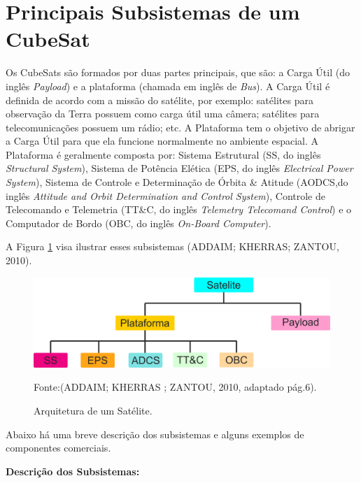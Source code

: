 \section{Principais Subsistemas de um CubeSat}

Os CubeSats são formados por duas partes principais, que são: a Carga Útil (do inglês \textit{Payload}) e a plataforma (chamada em inglês de \textit{Bus}). A Carga Útil é definida de acordo com a missão do satélite, por exemplo: satélites para observação da Terra possuem como carga útil uma câmera; satélites para telecomunicações possuem um rádio; etc. A Plataforma tem o objetivo de abrigar a Carga Útil para que ela funcione normalmente no ambiente espacial. A Plataforma é geralmente composta por: Sistema Estrutural (SS, do inglês \textit{Structural System}), Sistema de Potência Elética (EPS, do inglês \textit{Electrical Power System}), Sistema de Controle e Determinação de Órbita \& Atitude (AODCS,do inglês \textit{Attitude and Orbit Determination and Control System}), Controle de Telecomando e Telemetria (TT\&C, do inglês \textit{Telemetry Telecomand Control}) e o Computador de Bordo (OBC, do inglês \textit{On-Board Computer}). 

A Figura \ref{fig06} visa ilustrar esses subsistemas (ADDAIM; KHERRAS; ZANTOU, 2010).

\begin{figure}[h]
	\centering
    \caption{Arquitetura de um Satélite.}
	\includegraphics[keepaspectratio=true,scale=0.5]{figuras/estrutura_satellite.png}
	
	Fonte:(ADDAIM; KHERRAS ; ZANTOU, 2010, adaptado pág.6).
	
	\label{fig06}
\end{figure}

\newpage

Abaixo há uma breve descrição dos subsistemas e alguns exemplos de componentes comerciais.

\textbf{Descrição dos Subsistemas:}


